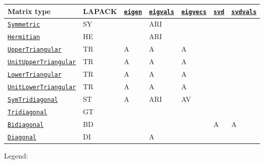 \begin{table}[h]

\begin{tabulary}{\linewidth}{|L|L|L|L|L|L|L|}
\hline
Matrix type & LAPACK & \hyperlink{11056016707394839114}{\texttt{eigen}} & \hyperlink{12334018763942871611}{\texttt{eigvals}} & \hyperlink{8591842276375230542}{\texttt{eigvecs}} & \hyperlink{6661056220970412040}{\texttt{svd}} & \hyperlink{12905968661134086149}{\texttt{svdvals}} \\
\hline
\hyperlink{17683454167504168761}{\texttt{Symmetric}} & SY &  & ARI &  &  &  \\
\hline
\hyperlink{938713992181310063}{\texttt{Hermitian}} & HE &  & ARI &  &  &  \\
\hline
\hyperlink{6344726545165008167}{\texttt{UpperTriangular}} & TR & A & A & A &  &  \\
\hline
\hyperlink{17221720404477798393}{\texttt{UnitUpperTriangular}} & TR & A & A & A &  &  \\
\hline
\hyperlink{15116078732779234709}{\texttt{LowerTriangular}} & TR & A & A & A &  &  \\
\hline
\hyperlink{2163321084999097240}{\texttt{UnitLowerTriangular}} & TR & A & A & A &  &  \\
\hline
\hyperlink{6062797780727203318}{\texttt{SymTridiagonal}} & ST & A & ARI & AV &  &  \\
\hline
\hyperlink{17820886359515748171}{\texttt{Tridiagonal}} & GT &  &  &  &  &  \\
\hline
\hyperlink{6156150905679680892}{\texttt{Bidiagonal}} & BD &  &  &  & A & A \\
\hline
\hyperlink{3300114559258360989}{\texttt{Diagonal}} & DI &  & A &  &  &  \\
\hline
\end{tabulary}

\end{table}



Legend:




